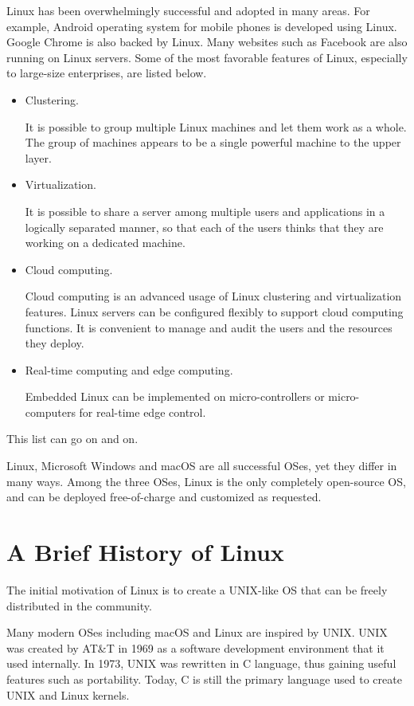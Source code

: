 Linux has been overwhelmingly successful and adopted in many areas. For example, Android operating system for mobile phones is developed using Linux. Google Chrome is also backed by Linux. Many websites such as Facebook are also running on Linux servers. Some of the most favorable features of Linux, especially to large-size enterprises, are listed below.
\begin{itemize}
  \item Clustering. 
  
  It is possible to group multiple Linux machines and let them work as a whole. The group of machines appears to be a single powerful machine to the upper layer.
  
  \item Virtualization. 
  
  It is possible to share a server among multiple users and applications in a logically separated manner, so that each of the users thinks that they are working on a dedicated machine.
  
  \item Cloud computing. 
  
  Cloud computing is an advanced usage of Linux clustering and virtualization features. Linux servers can be configured flexibly to support cloud computing functions. It is convenient to manage and audit the users and the resources they deploy. 
  
  \item Real-time computing and edge computing. 
  
  Embedded Linux can be implemented on micro-controllers or micro-computers for real-time edge control.
\end{itemize}
This list can go on and on.

Linux, Microsoft Windows and macOS are all successful OSes, yet they differ in many ways. Among the three OSes, Linux is the only completely open-source OS, and can be deployed free-of-charge and customized as requested.

\section{A Brief History of Linux}

The initial motivation of Linux is to create a UNIX-like OS that can be freely distributed in the community.

Many modern OSes including macOS and Linux are inspired by UNIX. UNIX was created by AT\&T in 1969 as a software development environment that it used internally. In 1973, UNIX was rewritten in C language, thus gaining useful features such as portability. Today, C is still the primary language used to create UNIX and Linux kernels.

